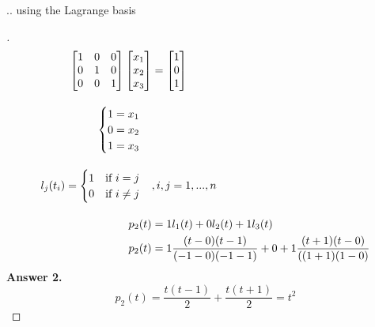 \documentclass[12pt]{article}
\newenvironment{exercise}[2][Exercise]{\begin{trivlist}
\item[\hskip \labelsep {\bfseries #1}\hskip \labelsep {\bfseries #2.}]}{\end{trivlist}}
\begin{document}
\begin{exercise}{2}
... using the Lagrange basis
\end{exercise} \vspace{-10mm}
\begin{proof}[]
	\begin{align*}
		\begin{bmatrix}	1 & 0 & 0 \\ 0 & 1 & 0 \\ 0 & 0 & 1	\end{bmatrix}
		\begin{bmatrix}	x_1 \\ x_2 \\ x_3 \end{bmatrix}
		&= \begin{bmatrix} 1 \\ 0 \\ 1	\end{bmatrix} \\[10pt]
		\begin{cases}
		1 = x_1 \\
		0 = x_2 \\
		1 = x_3
		\end{cases} \\[10pt]
		l_j(t_i) = \begin{cases}	1 \quad \textnormal{if } i = j \\ 0 \quad \textnormal{if } i \neq j \end{cases}&, i,j = 1, ..., n \\[10pt]
		p_{2}(t) &= 1 l_1(t) + 0 l_2(t) + 1 l_3(t)\\
		p_2(t) &= 1\frac{(t-0)(t-1)}{(-1 - 0)(-1 - 1)} + 0 + 1\frac{(t+1)(t-0)}{((1+1)(1-0)}\\	
	\end{align*}
	\textbf{Answer 2.} \vspace{-7mm} \\
		\[ p_{2}(t) = \frac{t(t-1)}{2} + \frac{t(t+1)}{2} = t^2 \]
\end{proof}
\end{document}
